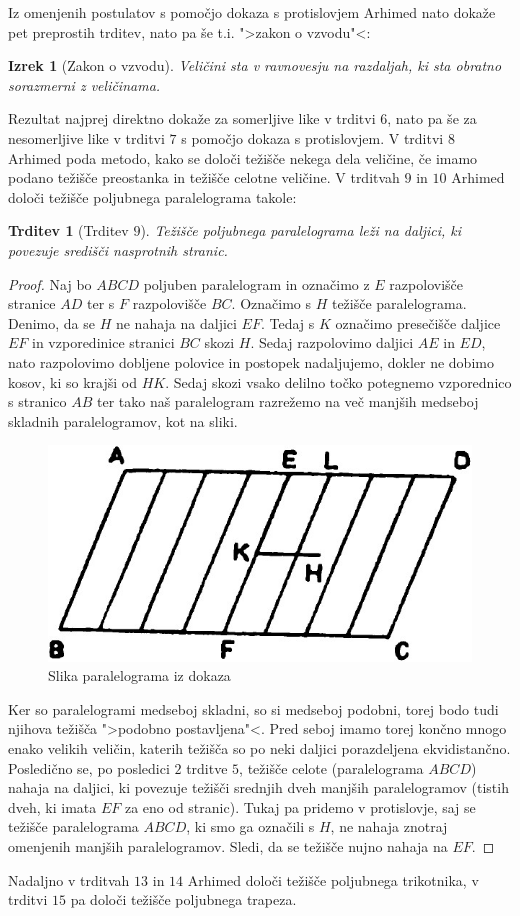 \documentclass[a4paper, 10pt]{article}
\newtheorem*{izr*}{Izrek}
\newtheorem*{trd*}{Trditev}
\begin{document}
		Iz omenjenih postulatov s pomočjo dokaza s protislovjem Arhimed nato dokaže pet preprostih trditev, nato pa še t.i. ">zakon o vzvodu"<:\begin{izr*}[Zakon o vzvodu]
			Veličini sta v ravnovesju na razdaljah, ki sta obratno sorazmerni z veličinama.
		\end{izr*} 
		Rezultat najprej direktno dokaže za somerljive like v trditvi $6$, nato pa še za nesomerljive like v trditvi $7$ s pomočjo dokaza s protislovjem. V trditvi $8$ Arhimed poda metodo, kako se določi težišče nekega dela veličine, če imamo podano težišče preostanka in težišče celotne veličine. V trditvah $9$ in $10$ Arhimed določi težišče poljubnega paralelograma takole: 
		\begin{trd*}[Trditev $9$]
			Težišče poljubnega paralelograma leži na daljici, ki povezuje središči nasprotnih stranic.
		\end{trd*}
		\begin{proof}
			Naj bo $ABCD$ poljuben paralelogram in označimo z $E$ razpolovišče stranice $AD$ ter s $F$ razpolovišče $BC$. Označimo s $H$ težišče paralelograma. Denimo, da se $H$ ne nahaja na daljici $EF$. Tedaj s $K$ označimo presečišče daljice $EF$ in vzporedinice stranici $BC$ skozi $H$. Sedaj razpolovimo daljici $AE$ in $ED$, nato razpolovimo dobljene polovice in postopek nadaljujemo, dokler ne dobimo kosov, ki so krajši od $HK$. Sedaj skozi vsako delilno točko potegnemo vzporednico s stranico $AB$ ter tako naš paralelogram razrežemo na več manjših medseboj skladnih paralelogramov, kot na sliki.
			\begin{figure}[h!]
				\centering
				\includegraphics[scale=0.5]{Paralelogram.jpg}
				\caption{Slika paralelograma iz dokaza}
			\end{figure}
			Ker so paralelogrami medseboj skladni, so si medseboj podobni, torej bodo tudi njihova težišča ">podobno postavljena"<. Pred seboj imamo torej končno mnogo enako velikih veličin, katerih težišča so po neki daljici porazdeljena ekvidistančno. Posledično se, po posledici $2$ trditve $5$, težišče celote (paralelograma $ABCD$) nahaja na daljici, ki povezuje težišči srednjih dveh manjših paralelogramov (tistih dveh, ki imata $EF$ za eno od stranic). Tukaj pa pridemo v protislovje, saj se težišče paralelograma $ABCD$, ki smo ga označili s $H$, ne nahaja znotraj omenjenih manjših paralelogramov. Sledi, da se težišče nujno nahaja na $EF$.
		\end{proof}
		Nadaljno v trditvah $13$ in $14$ Arhimed določi težišče poljubnega trikotnika, v trditvi $15$ pa določi težišče poljubnega trapeza. 
\end{document}
